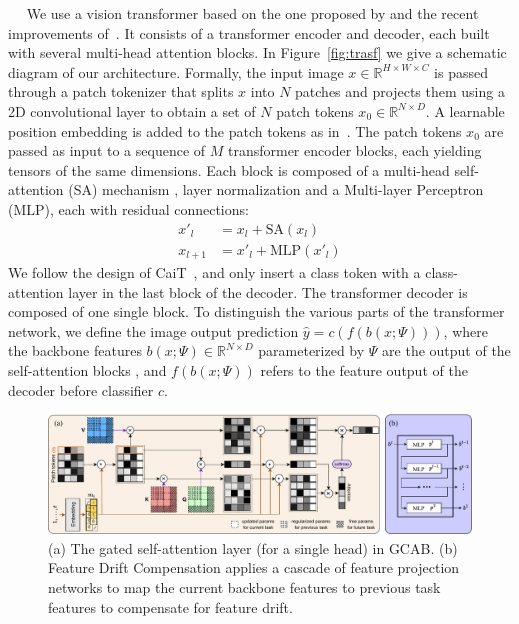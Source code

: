 \documentclass[twocolumn]{svjour3}          %
\newcommand{\minisection}[1]{\vspace{0.04in} \noindent {\bf #1}\ \ }
\begin{document}
\minisection{Transformer architecture.} 
We use a vision transformer based on the one proposed by \cite{dosovitskiy2020image} and the recent improvements of~\cite{touvron2021going}. It consists of a transformer encoder and decoder, each built with several multi-head attention blocks. In Figure~\ref{fig:trasf} we give a schematic diagram of our architecture. Formally, the input image $x \in \mathbb{R}^{H \times W \times C}$ is passed through a patch tokenizer that splits $x$ into $N$ patches and projects them using a 2D convolutional layer to obtain a set of $N$ patch tokens $x_0\in \mathbb{R}^{N \times D}$. A learnable position embedding 
is added to the patch tokens as in~\citep{gehring2017convolutional}. The patch tokens $x_0$ are passed as input to a sequence of $M$ transformer encoder blocks, each yielding tensors of the same dimensions. Each block is composed of a multi-head self-attention (SA) mechanism \citep{vaswani2017attention}, layer normalization and a Multi-layer Perceptron (MLP), each with residual connections: 
 \begin{equation}
    \begin{aligned}
        x'_l&=x_l+\text{SA}(x_l)\\
        x_{l+1}&= x'_l+\text{MLP}(x'_l)
        \label{eq:ViTblock}
     \end{aligned}
 \end{equation}
We follow the design of CaiT~\citep{touvron2021going}, and only insert a class token with a class-attention layer in the last block of the decoder. The transformer decoder is composed of one single block. To distinguish the various parts of the transformer network, we define the image output prediction $\hat y=c(f(b(x; \Psi)))$, where the backbone features $b(x; \Psi) \in \mathbb{R}^{N\times D}$ parameterized by $\Psi$ are the output of the self-attention blocks 
, and $f(b(x; \Psi))$ refers to the feature output of the decoder
before classifier $c$.



\begin{figure}[tb]
\begin{center}
\includegraphics[width=\linewidth]{images/GatedAttn.pdf}
\end{center}
\caption{(a) The gated self-attention layer (for a single head) in GCAB. (b) Feature Drift Compensation applies a cascade of feature projection networks to map the current backbone features to previous task features to compensate for feature drift.}
\label{fig:gating_proj}
\end{figure}
\end{document}

